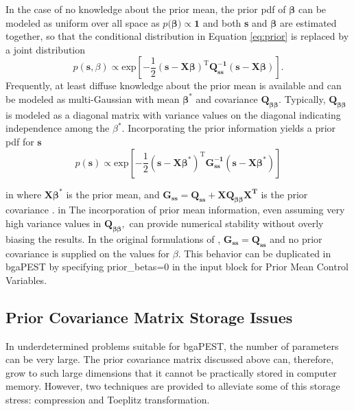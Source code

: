 \documentclass[11pt,oneside,onecolumn]{usgsreport}
\begin{document}
\begin{appendix}
\begin{bibunit}
In the case of no knowledge about the prior mean, the prior pdf of
$\mathbf{\beta}$ can be modeled as uniform over all space as $p(\mathbf{\beta)\propto1}$
and both \textbf{s} and $\mathbf{\beta}$ are estimated together,
so that the conditional distribution in Equation \ref{eq:prior} is
replaced by a joint distribution
\[
p(\mathbf{s},\beta)\propto\mathrm{exp\left[\mathbf{-}\frac{1}{2}(\mathbf{s-X\beta})^{T}\mathbf{Q_{ss}^{-1}}(\mathbf{s-X\beta})\right]}.
\]
 Frequently, at least diffuse knowledge about the prior mean is available
and can be modeled as multi-Gaussian with mean $\mathbf{\beta^{*}}$
and covariance $\mathbf{Q_{\beta\beta}}$. Typically, $\mathbf{Q_{\beta\beta}}$
is modeled as a diagonal matrix with variance values on the diagonal
indicating independence among the $\beta^{*}$. Incorporating the
prior information yields a prior pdf for $\mathbf{s}$
\begin{equation}
p(\mathbf{s})\propto\mathrm{exp\left[\mathbf{-}\frac{1}{2}(\mathbf{s-X\beta}^{*})^{T}\mathbf{G_{\mathbf{ss}}^{-1}}(\mathbf{s-X\beta^{*}})\right]}\label{eq:final_prior}
\end{equation}

 in
where $\mathbf{X\beta^{*}}$ is the prior mean, and $\mathbf{G_{ss}=Q_{ss}+XQ_{\beta\beta}X^{\mathbf{T}}}$
is the prior covariance \citep{NowakCirpka2004}.
 in
The incorporation of prior mean information, even assuming very high
variance values in $\mathbf{Q_{\beta\beta},}$ can provide numerical
stability without overly biasing the results. In the original formulations
of \citet{KitanidisVomvoris1983,HoeksemaKitanidis1984a,Kitanidis1995},
$\mathbf{G_{ss}}=\mathbf{Q_{ss}}$ and no prior covariance is supplied
on the values for $\beta.$ This behavior can be duplicated in bgaPEST
by specifying prior\_betas=0 in the input block for Prior Mean Control
Variables.


\subsection{Prior Covariance Matrix Storage Issues}

In underdetermined problems suitable for bgaPEST, the number of parameters
can be very large. The prior covariance matrix discussed above can,
therefore, grow to such large dimensions that it cannot be practically
stored in computer memory. However, two techniques are provided to
alleviate some of this storage stress: compression and Toeplitz transformation.


\end{bibunit}
\end{appendix}
\end{document}
